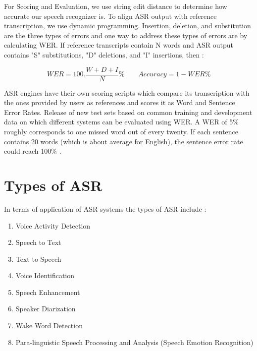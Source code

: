 For Scoring and Evaluation, we use string edit distance to determine how accurate our speech recognizer is. To align ASR output with reference transcription, we use dynamic programming. Insertion, deletion, and substitution are the three types of errors and one way to address these types of errors are by calculating WER. If reference transcripts contain N words and ASR output contains "S" substitutions, "D" deletions, and "I" insertions, then \cite{morris_wer_2004}:

   \begin{equation}
       WER = 100.\frac{W+D+I}{N} \% \quad \quad Accuracy = 1-WER \%
   \end{equation} 

ASR engines have their own scoring scripts which compare its transcription with the ones provided by users as references and scores it as Word and Sentence Error Rates. Release of new test sets based on common training and development data on which different systems can be evaluated using WER. A WER of 5\% roughly corresponds to one missed word out of every twenty. If each sentence contains 20 words (which is about average for English), the sentence error rate could reach 100\% \cite{patil_automatic_2016}.

\section{Types of ASR}
\label{sec:types-asr}
In terms of application of ASR systems the types of ASR include \cite{backstrom_introduction_2022}:
\begin{enumerate}
    \item Voice Activity Detection
    \item Speech to Text
    \item Text to Speech
    \item Voice Identification
    \item Speech Enhancement
    \item Speaker Diarization
    \item Wake Word Detection
    \item Para-linguistic Speech Processing and Analysis (Speech Emotion Recognition)
\end{enumerate}

